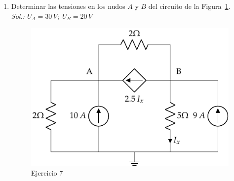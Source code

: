 \documentclass[11pt]{book} %
\begin{document}
\begin{enumerate}
\item Determinar las tensiones en los nudos $A$ y $B$ del circuito de la Figura~\ref{fig.ej14_BT1}.\\
\emph{Sol.: $U_A=30\,V;\;U_B=20\,V$}
\begin{figure}[H]
    \centering
    \includegraphics[]{../figs/ej14_BT1.pdf}
    \caption{Ejercicio 7}
    \label{fig.ej14_BT1}
\end{figure}


\end{enumerate}
\end{document}
